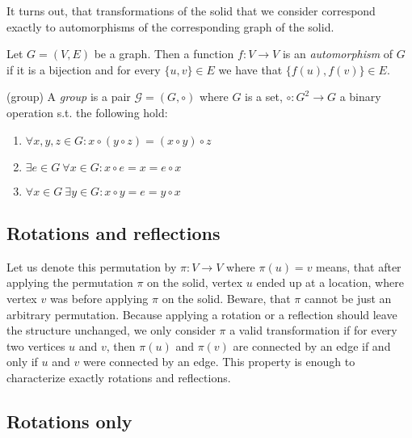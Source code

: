 \begin{highlight}

It turns out, that transformations of the solid that we consider correspond exactly to automorphisms of the corresponding graph of the solid.

\begin{defn}[automorphism]
    Let $G=(V,E)$ be a graph. Then a function $f:V \rightarrow V$ is an \emph{automorphism} of $G$ if it is a bijection and for every $\{u,v\} \in E$ we have that $\{f(u),f(v)\} \in E$.
\end{defn}

\begin{defn}(group)
    A \emph{group} is a pair $\mathcal{G}=(G,\circ)$ where $G$ is a set, $\circ:G^2 \rightarrow G$ a binary operation s.t. the following hold:
    \begin{enumerate}
        \item $\forall x,y,z \in G : x \circ (y \circ z) = ( x \circ y ) \circ z$
        \item $\exists e \in G \ \forall x \in G :x \circ e = x = e \circ x$
        \item $ \forall x \in G \ \exists y \in G : x \circ y = e = y \circ x$
    \end{enumerate}
\end{defn}

\end{highlight}

\subsection{Rotations and reflections}

Let us denote this permutation by $\pi : V \rightarrow V$ where $\pi(u) = v$ means, that after applying the permutation $\pi$ on the solid, vertex $u$ ended up at a location, where vertex $v$ was before applying $\pi$ on the solid. Beware, that $\pi$ cannot be just an arbitrary permutation. Because applying a rotation or a reflection should leave the structure unchanged, we only consider $\pi$ a valid transformation if for every two vertices $u$ and $v$, then $\pi(u)$ and $\pi(v)$ are connected by an edge if and only if $u$ and $v$ were connected by an edge. This property is enough to characterize exactly rotations and reflections.

\subsection{Rotations only}

